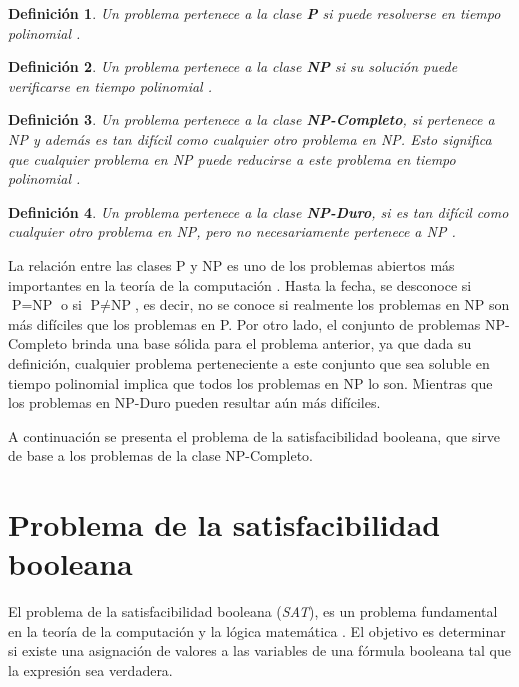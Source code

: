 \documentclass[12pt]{article}
\newtheorem{definition}{Definición}
\begin{document}
\begin{definition}
  Un problema pertenece a la clase \textbf{P} si puede resolverse en tiempo polinomial \cite{authomataTheory}.
\end{definition}

\begin{definition}
  Un problema pertenece a la clase \textbf{NP} si su solución puede verificarse en tiempo polinomial \cite{authomataTheory}.
\end{definition}

\begin{definition}
  Un problema pertenece a la clase \textbf{NP-Completo}, si pertenece a NP y además es tan difícil como cualquier otro problema en NP. Esto significa que cualquier problema en NP puede reducirse a este problema en tiempo polinomial \cite{authomataTheory}.
\end{definition}

\begin{definition}
  Un problema pertenece a la clase \textbf{NP-Duro}, si es tan difícil como cualquier otro problema en NP, pero no necesariamente pertenece a NP \cite{authomataTheory}. 
\end{definition}

La relación entre las clases P y NP es uno de los problemas abiertos más importantes en la teoría de la computación 
\cite{authomataTheory}. Hasta la fecha, se desconoce si $\text{P} = \text{NP}$ o si $\text{P} \neq \text{NP}$, es decir, 
no se conoce si realmente los problemas en NP son más difíciles que los problemas en P. Por otro lado, el conjunto de 
problemas NP-Completo brinda una base sólida para el problema anterior, ya que dada su definición, cualquier problema 
perteneciente a este conjunto que sea soluble en tiempo polinomial implica que todos los problemas en NP lo son. 
Mientras que los problemas en NP-Duro pueden resultar aún más difíciles. 

A continuación se presenta el problema de la satisfacibilidad booleana, que sirve de base a los problemas de la clase NP-Completo.

\section{Problema de la satisfacibilidad booleana}

El problema de la satisfacibilidad booleana (\textit{SAT}), es un problema fundamental en la teoría de la computación y la lógica matemática \cite{authomataTheory}. El objetivo es determinar si existe una asignación de valores a las variables de una fórmula booleana tal que la expresión sea verdadera.
\end{document}
